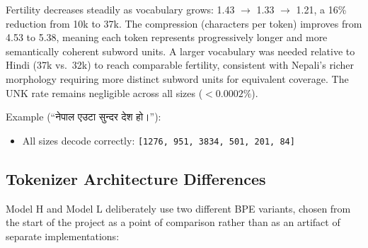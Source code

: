 \documentclass[11pt]{article}
\newcommand{\dn}[1]{{\devanagarifont #1}}
\begin{document}
\begin{figure}[h]
\centering
{}
\end{figure}

Fertility decreases steadily as vocabulary grows: 1.43 $\to$ 1.33 $\to$ 1.21, a 16\% reduction from 10k to 37k. The compression (characters per token) improves from 4.53 to 5.38, meaning each token represents progressively longer and more semantically coherent subword units. A larger vocabulary was needed relative to Hindi (37k vs.\ 32k) to reach comparable fertility, consistent with Nepali's richer morphology requiring more distinct subword units for equivalent coverage. The UNK rate remains negligible across all sizes ($< 0.0002\%$).

Example (\dn{``नेपाल एउटा सुन्दर देश हो।''}):
\begin{itemize}[nosep]
    \item All sizes decode correctly: \texttt{[1276, 951, 3834, 501, 201, 84]}
\end{itemize}

\subsection{Tokenizer Architecture Differences}

Model H and Model L deliberately use two different BPE variants, chosen from the start of the project as a point of comparison rather than as an artifact of separate implementations:
\end{document}
